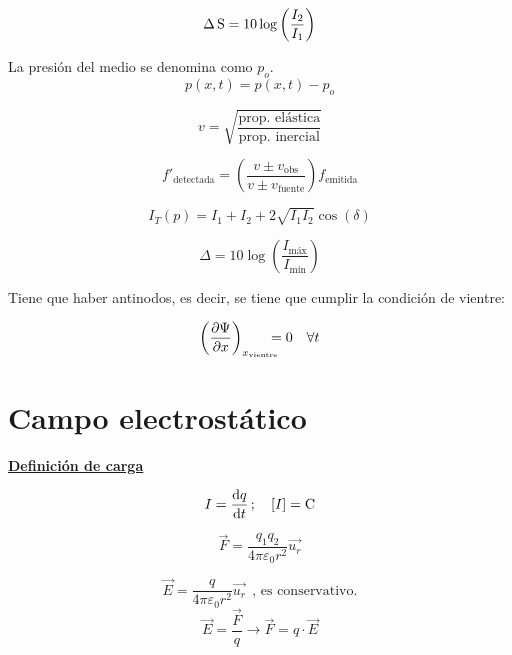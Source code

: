 \documentclass[a4paper]{book}
\begin{document}
\begin{landscape}
\begin{fleqn}
\begin{multicols}{4}
		\[\Delta \S = 10 \log{\left( \frac{I_2}{I_1} \right) }\]

		\vspace{5pt}

		\noindent La presión del medio se denomina como $p_o$.
		\[p \left( x,t \right) = p(x,t) -p_o \]

		\[v=\sqrt{\frac{\text{prop. elástica}}{\text{prop. inercial}}}\]

		\[f'_{\text{detectada}}=\left( \frac{v\pm v_{\text{obs}}}{v\pm v_{\text{fuente}}} \right)f_{\text{emitida}}\]

		\[I_T(p)=I_1+I_2+2\sqrt{I_1I_2}\cos{\left(\delta \right)}\]

		\[\Delta = 10 \log{\left( \frac{I_{\text{máx}}}{I_{\text{mín}}} \right)}\]

		\vspace{5pt}

		\noindent Tiene que haber antinodos, es decir, se tiene que cumplir la condición de vientre:

		\[\left( \pdv{\Psi}{x} \right)_{x_{\text{vientre}}}\! \! \! \! \! =0\quad \forall t\]

	\end{multicols}
\end{fleqn}

\newpage
\section{Campo electrostático}

\begin{fleqn}
	\begin{multicols}{4}
		\noindent \textbf{\underline{Definición de carga}}

		\[ I = \dv{q}{t} \, ; \quad [I] = \SI{}{C} \]

		\[\vec{F}=\frac{q_1q_2}{4\pi \varepsilon _0r^2}\vec{u_r}\]

		\[\vec{E}=\frac{q}{4\pi \varepsilon _0r^2}\vec{u_r}\ \ \text{, es conservativo.}\]
		\[\vec{E} =\frac{\vec{F}}{q} \longrightarrow \vec{F}=q\cdot \vec{E}\]

		\vspace{5pt}


\end{multicols}
\end{fleqn}
\end{landscape}
\end{document}
